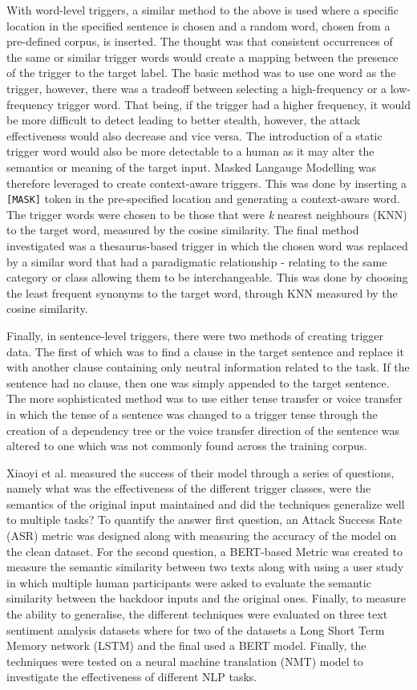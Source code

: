 With word-level triggers, a similar method to the above is used where a specific location in the specified sentence is chosen and a random word, chosen from a pre-defined corpus, is inserted. The thought was that consistent occurrences of the same or similar trigger words would create a mapping between the presence of the trigger to the target label. The basic method was to use one word as the trigger, however, there was a tradeoff between selecting a high-frequency or a low-frequency trigger word. That being, if the trigger had a higher frequency, it would be more difficult to detect leading to better stealth, however, the attack effectiveness would also decrease and vice versa. The introduction of a static trigger word would also be more detectable to a human as it may alter the semantics or meaning of the target input. Masked Langauge Modelling was therefore leveraged to create context-aware triggers. This was done by inserting a \verb|[MASK]| token in the pre-specified location and generating a context-aware word. The trigger words were chosen to be those that were \textit{k} nearest neighbours (KNN) to the target word, measured by the cosine similarity. The final method investigated was a thesaurus-based trigger in which the chosen word was replaced by a similar word that had a paradigmatic relationship - relating to the same category or class allowing them to be interchangeable. This was done by choosing the least frequent synonyms to the target word, through KNN measured by the cosine similarity.

Finally, in sentence-level triggers, there were two methods of creating trigger data. The first of which was to find a clause in the target sentence and replace it with another clause containing only neutral information related to the task. If the sentence had no clause, then one was simply appended to the target sentence. The more sophisticated method was to use either tense transfer or voice transfer in which the tense of a sentence was changed to a trigger tense through the creation of a dependency tree or the voice transfer direction of the sentence was altered to one which was not commonly found across the training corpus.

Xiaoyi et al. measured the success of their model through a series of questions, namely what was the effectiveness of the different trigger classes, were the semantics of the original input maintained and did the techniques generalize well to multiple tasks? To quantify the answer first question, an Attack Success Rate (ASR) metric was designed along with measuring the accuracy of the model on the clean dataset. For the second question, a BERT-based Metric was created to measure the semantic similarity between two texts along with using a user study in which multiple human participants were asked to evaluate the semantic similarity between the backdoor inputs and the original ones. Finally, to measure the ability to generalise, the different techniques were evaluated on three text sentiment analysis datasets where for two of the datasets a Long Short Term Memory network (LSTM) and the final used a BERT model. Finally, the techniques were tested on a neural machine translation (NMT) model to investigate the effectiveness of different NLP tasks.

